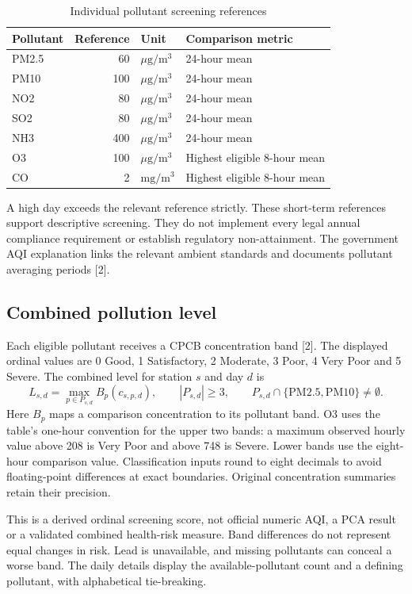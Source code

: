 \documentclass[11pt,a4paper]{article}
\newcommand{\units}{\ensuremath{\mu\mathrm{g}/\mathrm{m}^{3}}}
\begin{document}
\begin{table}[H]\centering\caption{Individual pollutant screening references}
\begin{tabularx}{\linewidth}{lrlY}\toprule
Pollutant & Reference & Unit & Comparison metric\\\midrule
PM2.5 & 60 & \units & 24-hour mean\\
PM10 & 100 & \units & 24-hour mean\\
NO2 & 80 & \units & 24-hour mean\\
SO2 & 80 & \units & 24-hour mean\\
NH3 & 400 & \units & 24-hour mean\\
O3 & 100 & \units & Highest eligible 8-hour mean\\
CO & 2 & $\mathrm{mg}/\mathrm{m}^{3}$ & Highest eligible 8-hour mean\\\bottomrule
\end{tabularx}\end{table}

A high day exceeds the relevant reference strictly. These short-term references support descriptive screening. They do not implement every legal annual compliance requirement or establish regulatory non-attainment. The government AQI explanation links the relevant ambient standards and documents pollutant averaging periods [2].

\subsection{Combined pollution level}
Each eligible pollutant receives a CPCB concentration band [2]. The displayed ordinal values are 0 Good, 1 Satisfactory, 2 Moderate, 3 Poor, 4 Very Poor and 5 Severe. The combined level for station $s$ and day $d$ is
\[
 L_{s,d}=\max_{p\in P_{s,d}} B_p(c_{s,p,d}),
 \qquad |P_{s,d}|\geq3,
 \qquad P_{s,d}\cap\{\mathrm{PM2.5},\mathrm{PM10}\}\ne\emptyset.
\]
Here $B_p$ maps a comparison concentration to its pollutant band. O3 uses the table's one-hour convention for the upper two bands: a maximum observed hourly value above 208 is Very Poor and above 748 is Severe. Lower bands use the eight-hour comparison value. Classification inputs round to eight decimals to avoid floating-point differences at exact boundaries. Original concentration summaries retain their precision.

This is a derived ordinal screening score, not official numeric AQI, a PCA result or a validated combined health-risk measure. Band differences do not represent equal changes in risk. Lead is unavailable, and missing pollutants can conceal a worse band. The daily details display the available-pollutant count and a defining pollutant, with alphabetical tie-breaking.
\end{document}
